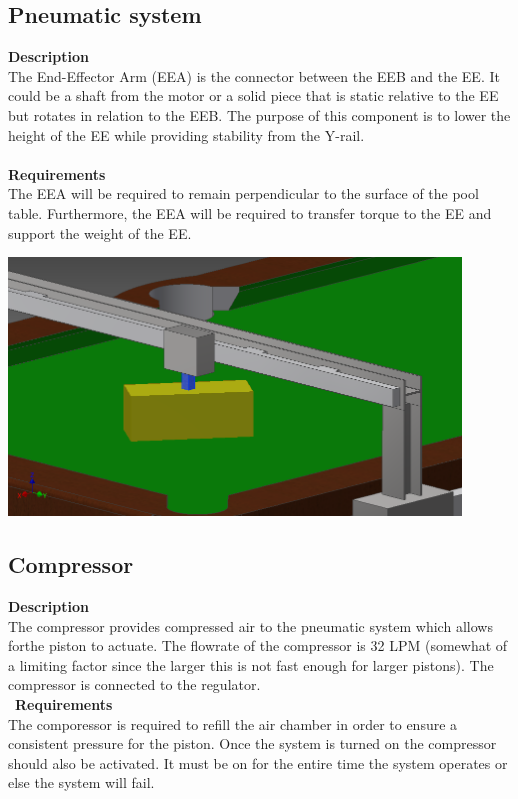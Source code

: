 \documentclass[titlepage]{article}
\begin{document}
\begin{center}
\begin{center}
\begin{center}
\begin{center}
\begin{center}
\begin{center}
\begin{center}
\begin{center}
\begin{center}
\begin{center}
\begin{center}
\begin{center}
\begin{center}
\subsection{Pneumatic system}
\textbf{Description}\\
The End-Effector Arm (EEA) is the connector between the EEB and the EE. It could be a shaft from the motor or a solid piece that is static relative to the EE but rotates in relation to the EEB. The purpose of this component is to lower the height of the EE while providing stability from the Y-rail.\\\\
\textbf{Requirements}\\
The EEA will be required to remain perpendicular to the surface of the pool table. Furthermore, the EEA will be required to transfer torque to the EE and support the weight of the EE.
\begin{center}
	\includegraphics[width = 0.9\textwidth]{efArm.png}	%
\label{fig:eeaFig}
\end{center}


\subsection{Compressor}
\textbf{Description}\\
The compressor provides compressed air to the pneumatic system which allows forthe piston to actuate. The flowrate of the compressor is 32 LPM (somewhat of a limiting factor since the larger this is not fast enough for larger pistons). The compressor is connected to the regulator.\\\
\textbf{Requirements}\\
The comporessor is required to refill the air chamber in order to ensure a consistent pressure for the piston. Once the system is turned on the compressor should also be activated. It must be on for the entire time the system operates or else the system will fail.
\begin{center}


\end{center}
\end{center}
\end{center}
\end{center}
\end{center}
\end{center}
\end{center}
\end{center}
\end{center}
\end{center}
\end{center}
\end{center}
\end{center}
\end{center}
\end{document}
